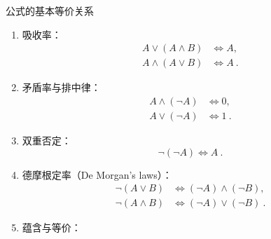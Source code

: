 \begin{theorem}{公式的基本等价关系}
\begin{enumerate}
\item 吸收率：
\begin{equation}
\begin{aligned}
A \lor (A \land B) &\Leftrightarrow A, \\
A \land (A \lor B) &\Leftrightarrow A ~.
\end{aligned}
\end{equation}
\item 矛盾率与排中律：
\begin{equation}
\begin{aligned}
A \land (\neg A) &\Leftrightarrow 0, \\
A \lor (\neg A) &\Leftrightarrow 1~.
\end{aligned}
\end{equation}
\item 双重否定：
\begin{equation}
\neg (\neg A) \Leftrightarrow A ~.
\end{equation}
\item 德摩根定率（De Morgan's laws）：
\begin{equation}
\begin{aligned}
\neg(A \lor B) &\Leftrightarrow (\neg A) \land (\neg B) , \\
\neg(A \land B) &\Leftrightarrow (\neg A) \lor (\neg B) ~.
\end{aligned}
\end{equation}
\item 蕴含与等价：
\begin{equation}

\end{equation}


\end{enumerate}
\end{theorem}